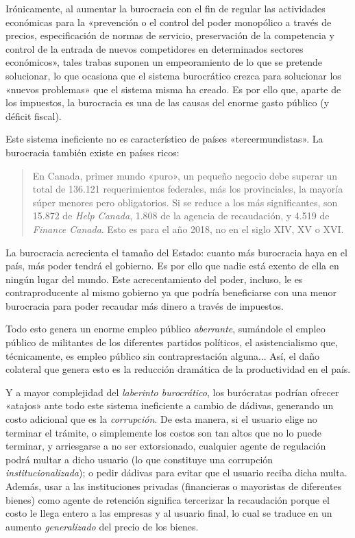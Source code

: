 \documentclass[12pt,a4paper,twoside]{book}
\begin{document}
Irónicamente, al aumentar la burocracia con el fin de regular las actividades económicas para la «prevención o el control del poder monopólico a través de precios, especificación de normas de servicio, preservación de la competencia y control de la entrada de nuevos competidores en determinados sectores económicos», tales trabas suponen un empeoramiento de lo que se pretende solucionar, lo que ocasiona que el sistema burocrático crezca para solucionar los «nuevos problemas» que el sistema misma ha creado. Es por ello que, aparte de los impuestos, la burocracia es una de las causas del enorme gasto público (y déficit fiscal).

Este sistema ineficiente no es característico de países «tercermundistas». La burocracia también existe en países ricos:

\begin{quotation}
En Canada, primer mundo «puro», un pequeño negocio debe superar un total de 136.121 requerimientos federales, más los provinciales, la mayoría súper menores pero obligatorios. Si se reduce a los más significantes, son 15.872 de \textit{Help Canada}, 1.808 de la agencia de recaudación, y 4.519 de \textit{Finance Canada}. Esto es para el año 2018, no en el siglo XIV, XV o XVI. \cite[CT: 4:43-5:18]{rompiendolabanca:burocracia}
\end{quotation}

La burocracia acrecienta el tamaño del Estado: cuanto más burocracia haya en el país, más poder tendrá el gobierno. Es por ello que nadie está exento de ella en ningún lugar del mundo. Este acrecentamiento del poder, incluso, le es contraproducente al mismo gobierno ya que podría beneficiarse con una menor burocracia para poder recaudar más dinero a través de impuestos. 

Todo esto genera un enorme empleo público \textit{aberrante}, sumándole el empleo público de militantes de los diferentes partidos políticos, el asistencialismo que, técnicamente, es empleo público sin contraprestación alguna... Así, el daño colateral que genera esto es la reducción dramática de la productividad en el país. 

Y a mayor complejidad del \textit{laberinto burocrático}, los burócratas podrían ofrecer «atajos» ante todo este sistema ineficiente a cambio de dádivas, generando un costo adicional que es la \textit{corrupción}. De esta manera, si el usuario elige no terminar el trámite, o simplemente los costos son tan altos que no lo puede terminar, y arriesgarse a no ser extorsionado, cualquier agente de regulación podrá multar a dicho usuario (lo que constituye una corrupción \textit{institucionalizada}); o pedir dádivas para evitar que el usuario reciba dicha multa. Además, usar a las instituciones privadas (financieras o mayoristas de diferentes bienes) como agente de retención significa tercerizar la recaudación porque el costo le llega entero a las empresas y al usuario final, lo cual se traduce en un aumento \textit{generalizado} del precio de los bienes.
\end{document}
